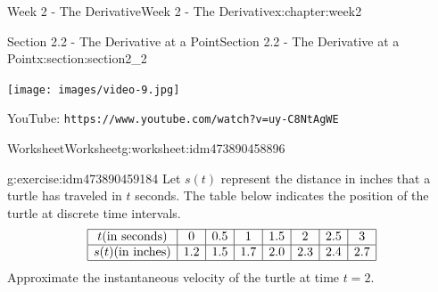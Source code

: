\documentclass[oneside,10pt,]{book}
\newcommand{\mono}[1]{\texttt{#1}}
\numberwithin{equation}{section}
\newlength{\qrsize}
\newlength{\previewwidth}
\begin{document}
\begin{chapterptx}{Week 2 - The Derivative}{}{Week 2 - The Derivative}{}{}{x:chapter:week2}
%
%
\typeout{************************************************}
\typeout{************************************************}
%
\begin{sectionptx}{Section 2.2 - The Derivative at a Point}{}{Section 2.2 - The Derivative at a Point}{}{}{x:section:section2_2}
\setlength{\qrsize}{9em}
\setlength{\previewwidth}{\linewidth}
\addtolength{\previewwidth}{-\qrsize}
\begin{tcbraster}[raster columns=2, raster column skip=1pt, raster halign=center, raster force size=false, raster left skip=0pt, raster right skip=0pt]%
\begin{tcolorbox}[previewstyle, width=\previewwidth]%
\texttt{[image: images/video-9.jpg]}%
\end{tcolorbox}%
\begin{tcolorbox}[qrstyle]%
{\hypersetup{urlcolor=black}}%
\end{tcolorbox}%
\begin{tcolorbox}[captionstyle]%
\small YouTube: \mono{https://www.youtube.com/watch?v=uy-C8NtAgWE}\end{tcolorbox}%
\end{tcbraster}%
%
%
\typeout{************************************************}
\typeout{************************************************}
%
\begin{worksheet-subsection}{Worksheet}{}{Worksheet}{}{}{g:worksheet:idm473890458896}
\begin{divisionexercise}{1}{}{}{g:exercise:idm473890459184}%
Let \(s(t)\) represent the distance in inches that a turtle has traveled in \(t\) seconds. The table below indicates the position of the turtle at discrete time intervals.%
\begin{equation*}
\begin{array} {| c | c | c | c | c | c | c | c |}
\hline t \text{(in seconds)}& 0 & 0.5 & 1 & 1.5 & 2 & 2.5 & 3 \\
\hline s(t) \text{(in inches)}& 1.2 & 1.5 & 1.7 & 2.0 & 2.3 & 2.4 & 2.7 \\
\hline
\end{array} 
\end{equation*}
Approximate the instantaneous velocity of the turtle at time \(t=2\).%

\end{divisionexercise}
\end{worksheet-subsection}
\end{sectionptx}
\end{chapterptx}
\end{document}
